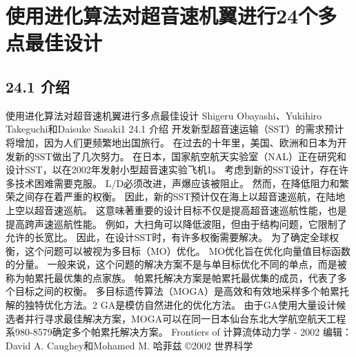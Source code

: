 \documentclass[UTF8,11pt,a4paper,openany,fontset=fandol]{ctexbook}
\begin{document}
\clearpage
\chapter{使用进化算法对超音速机翼进行24个多点最佳设计}
\section{24.1 介绍}
使用进化算法对超音速机翼进行多点最佳设计 Shigeru Obayashi、Yukihiro Takeguchi和Daisuke Sasaki1 24.1 介绍 开发新型超音速运输（SST）的需求预计将增加，因为人们更频繁地出国旅行。 在过去的十年里，美国、欧洲和日本为开发新的SST做出了几次努力。 在日本，国家航空航天实验室（NAL）正在研究和设计SST，以在2002年发射小型超音速实验飞机1。 考虑到新的SST设计，存在许多技术困难需要克服。 L/D必须改进，声爆应该被阻止。 然而，在降低阻力和繁荣之间存在着严重的权衡。 因此，新的SST预计仅在海上以超音速巡航，在陆地上空以超音速巡航。 这意味著重要的设计目标不仅是提高超音速巡航性能，也是提高跨声速巡航性能。 例如，大扫角可以降低波阻，但由于结构问题，它限制了允许的长宽比。 因此，在设计SST时，有许多权衡需要解决。 为了确定全球权衡，这个问题可以被视为多目标（MO）优化。 MO优化旨在优化向量值目标函数的分量。 一般来说，这个问题的解决方案不是与单目标优化不同的单点，而是被称为帕累托最优集的点家族。 帕累托解决方案是帕累托最优集的成员，代表了多个目标之间的权衡。 多目标遗传算法（MOGA）是高效和有效地采样多个帕累托解的独特优化方法。2 GA是模仿自然进化的优化方法。 由于GA使用大量设计候选者并行寻求最佳解决方案，MOGA可以在同一日本仙台东北大学航空航天工程系980-8579确定多个帕累托解决方案。 Frontiers of 计算流体动力学 - 2002 编辑：David A. Caughey和Mohamed M. 哈菲兹 ©2002 世界科学
\end{document}
